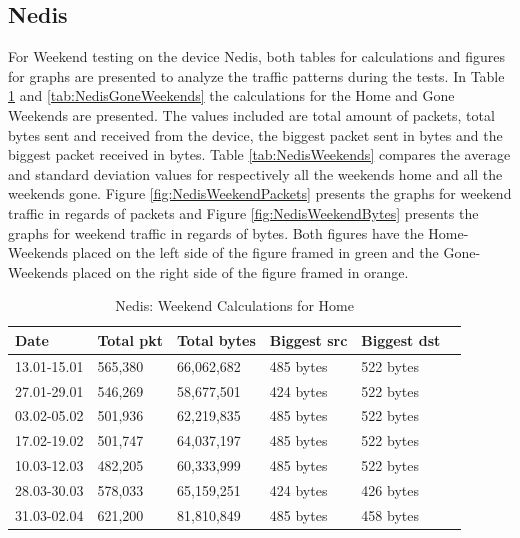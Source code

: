 \subsection{Nedis}
For Weekend testing on the device Nedis, both tables for calculations and figures for graphs are presented to analyze the traffic patterns during the tests. In Table \ref{tab:NedisHomeWeekends} and \ref{tab:NedisGoneWeekends} the calculations for the Home and Gone Weekends are presented. The values included are total amount of packets, total bytes sent and received from the device, the biggest packet sent in bytes and the biggest packet received in bytes. Table \ref{tab:NedisWeekends} compares the average and standard deviation values for respectively all the weekends home and all the weekends gone. Figure \ref{fig:NedisWeekendPackets} presents the graphs for weekend traffic in regards of packets and Figure \ref{fig:NedisWeekendBytes} presents the graphs for weekend traffic in regards of bytes. Both figures have the Home-Weekends placed on the left side of the figure framed in green and the Gone-Weekends placed on the right side of the figure framed in orange.  

\begin{table}[H]
    \centering
    \caption{Nedis: Weekend Calculations for Home}
    \begin{tabular}{|l|l|l|l|l|l|}
        \hline
        \textbf{Date}    & \textbf{Total pkt} & \textbf{Total bytes} & \textbf{Biggest src} & \textbf{Biggest dst} \\ \hline
        13.01-15.01      & 565,380            & 66,062,682           & 485 bytes            & 522 bytes            \\ \hline
        27.01-29.01      & 546,269            & 58,677,501           & 424 bytes            & 522 bytes            \\ \hline
        03.02-05.02      & 501,936            & 62,219,835           & 485 bytes            &    522 bytes            \\ \hline
        17.02-19.02      & 501,747            & 64,037,197           & 485 bytes            & 522 bytes            \\ \hline
        10.03-12.03      & 482,205            & 60,333,999           & 485 bytes            & 522 bytes            \\ \hline
        28.03-30.03      & 578,033            & 65,159,251           & 424 bytes            & 426 bytes            \\ \hline
        31.03-02.04      & 621,200            & 81,810,849           & 485 bytes            & 458 bytes            \\ \hline
    \end{tabular}
    \label{tab:NedisHomeWeekends}
\end{table}

